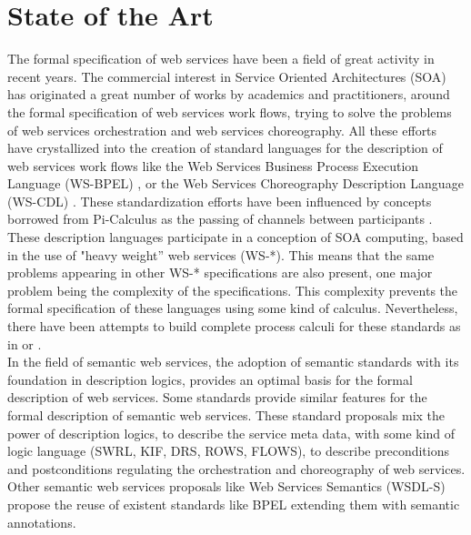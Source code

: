\section{State of the Art}
The formal specification of web services have been a field of great activity in recent years. The commercial interest in
Service Oriented Architectures (SOA) has originated a great number of works by academics and practitioners, around the formal
specification of web services work flows, trying to solve the problems of web services orchestration and web services
choreography.  All these efforts have crystallized into the creation of standard languages for
the description of web services work flows like the Web Services Business Process Execution Language (WS-BPEL)
\cite{Fu04analysisof},  or the Web Services Choreography Description Language (WS-CDL)
\cite{Burdett:05:WSC}. These standardization efforts have been influenced by concepts borrowed from Pi-Calculus as the passing
of channels between participants \cite{chan08chor}. \\

These description languages participate in a conception of SOA computing, based in the use of "heavy weight'' web services
(WS-*). This means that the same problems appearing in other WS-* specifications are also present, one
major problem being the complexity of the specifications. This complexity prevents the formal specification of these
languages using some kind of calculus. Nevertheless, there have been attempts to build complete process calculi for
these standards as in \cite{Lucchi05api-calculus} or \cite{Lapadula07acalculus}. \\

In the field of semantic web services, the adoption of semantic standards with its foundation in description logics,
provides an optimal basis for the formal description of web services. Some standards provide similar features for the formal description of semantic web services. These standard proposals
mix the power of description logics, to describe the service meta data, with some kind of logic language (SWRL, KIF, DRS,
ROWS, FLOWS),  to describe preconditions and postconditions regulating the orchestration and choreography of web
services. Other semantic web services proposals like Web Services Semantics (WSDL-S)  \cite{wsdls}  propose the reuse of
existent standards like BPEL extending them with semantic annotations.\\

